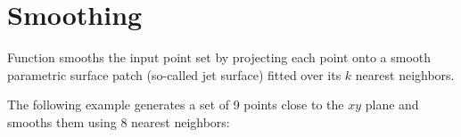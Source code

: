 \section{Smoothing}

Function  smooths the input point set by projecting each point onto a smooth parametric surface patch (so-called jet surface) fitted over its $k$ nearest neighbors.\\


\ccExample

The following example generates a set of 9 points close to the $xy$ plane and smooths them using 8 nearest neighbors:
